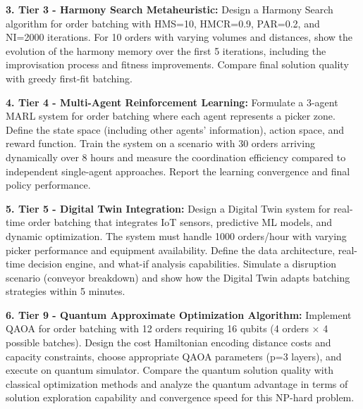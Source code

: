 \documentclass{article}
\begin{document}
\textbf{3. Tier 3 - Harmony Search Metaheuristic:}
Design a Harmony Search algorithm for order batching with HMS=10, HMCR=0.9, PAR=0.2, and NI=2000 iterations. For 10 orders with varying volumes and distances, show the evolution of the harmony memory over the first 5 iterations, including the improvisation process and fitness improvements. Compare final solution quality with greedy first-fit batching.

\textbf{4. Tier 4 - Multi-Agent Reinforcement Learning:}
Formulate a 3-agent MARL system for order batching where each agent represents a picker zone. Define the state space (including other agents' information), action space, and reward function. Train the system on a scenario with 30 orders arriving dynamically over 8 hours and measure the coordination efficiency compared to independent single-agent approaches. Report the learning convergence and final policy performance.

\textbf{5. Tier 5 - Digital Twin Integration:}
Design a Digital Twin system for real-time order batching that integrates IoT sensors, predictive ML models, and dynamic optimization. The system must handle 1000 orders/hour with varying picker performance and equipment availability. Define the data architecture, real-time decision engine, and what-if analysis capabilities. Simulate a disruption scenario (conveyor breakdown) and show how the Digital Twin adapts batching strategies within 5 minutes.

\textbf{6. Tier 9 - Quantum Approximate Optimization Algorithm:}
Implement QAOA for order batching with 12 orders requiring 16 qubits (4 orders × 4 possible batches). Design the cost Hamiltonian encoding distance costs and capacity constraints, choose appropriate QAOA parameters (p=3 layers), and execute on quantum simulator. Compare the quantum solution quality with classical optimization methods and analyze the quantum advantage in terms of solution exploration capability and convergence speed for this NP-hard problem.
\end{document}
